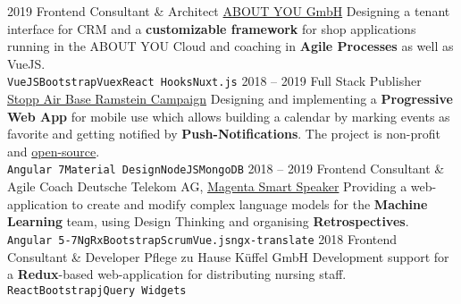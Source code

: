 \documentclass[9pt]{developercv} %
\begin{document}
\begin{entrylist}
  \entry
		{2019}
		{Frontend Consultant \& Architect}
		{\href{https://cloud.aboutyou.com/}{ABOUT YOU GmbH}}
    {
      Designing a tenant interface for CRM and a \textbf{customizable framework} for shop applications
      running in the ABOUT YOU Cloud and coaching in \textbf{Agile Processes} as well as VueJS.\\
      \texttt{VueJS}\slashsep\texttt{Bootstrap}\slashsep\texttt{Vuex}\slashsep\texttt{React Hooks}\slashsep\texttt{Nuxt.js}
    }
	\entry
		{2018 -- 2019}
		{Full Stack Publisher}
		{\href{https://www.ramstein-kampagne.eu/}{Stopp Air Base Ramstein Campaign}}
    {
      Designing and implementing a \textbf{Progressive Web App} for mobile use which allows building a calendar by
      marking events as favorite and getting notified by \textbf{Push-Notifications}. The project is non-profit and
      \href{https://github.com/frot-io/ramstein-conference-app}{open-source}.\\
      \texttt{Angular 7}\slashsep\texttt{Material Design}\slashsep\texttt{NodeJS}\slashsep\texttt{MongoDB}
    }
  \entry
		{2018 -- 2019}
		{Frontend Consultant \& Agile Coach}
		{Deutsche Telekom AG, \href{https://www.telekom.de/zuhause/geraete-und-zubehoer/smart-speaker}{Magenta Smart Speaker}}
    {
      Providing a web-application to create and modify complex language models for the
      \textbf{Machine Learning} team, using Design Thinking and organising \textbf{Retrospectives}.\\
      \texttt{Angular 5-7}\slashsep\texttt{NgRx}\slashsep\texttt{Bootstrap}\slashsep\texttt{Scrum}\slashsep\texttt{Vue.js}\slashsep\texttt{ngx-translate}
    }
	\entry
		{2018}
		{Frontend Consultant \& Developer}
		{Pflege zu Hause Küffel GmbH}
		{
      Development support for a \textbf{Redux}-based web-application for distributing nursing staff.\\
      \texttt{React}\slashsep\texttt{Bootstrap}\slashsep\texttt{jQuery Widgets}
    }
\end{entrylist}



\end{document}
